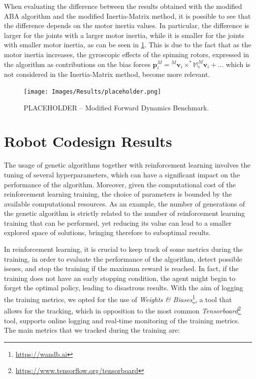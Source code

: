 When evaluating the difference between the results obtained with the modified \ac{ABA} algorithm and the modified Inertia-Matrix method, it is possible to see that the difference depends on the motor inertia values. In particular, the difference is larger for the joints with a larger motor inertia, while it is smaller for the joints with smaller motor inertia, as can be seen in \cref{fig:fd_comparison}. This is due to the fact that as the motor inertia increases, the gyroscopic effects of the spinning rotors,
expressed in the algorithm as contributions on the bias forces $\mathbf{p}^M _i = {}^M \mathbf{v}_i \times ^* \mathbb{M}_i ^M \mathbf{v}_i + \dots$ which is not considered in the Inertia-Matrix method, become more relevant.

\begin{figure}
    \centering
    \caption{PLACEHOLDER -- Modified Forward Dynamics Benchmark.}
    \label{fig:fd_comparison}
    \texttt{[image: Images/Results/placeholder.png]}
\end{figure}

\section{Robot Codesign Results}
\label{sec:codesign_results}

The usage of genetic algorithms together with reinforcement learning involves the tuning of several hyperparameters, which can have a significant impact on the performance of the algorithm. Moreover, given the computational cost of the reinforcement learning training, the choice of parameters is bounded by the available computational resources. As an example, the number of generations of the genetic algorithm is strictly related to the number of reinforcement learning training that can be performed, yet reducing its value can lead to a smaller explored space of solutions, bringing therefore to suboptimal results.

In reinforcement learning, it is crucial to keep track of some metrics during the training, in order to evaluate the performance of the algorithm, detect possible issues, and stop the training if the maximum reward is reached. In fact, if the training does not have an early stopping condition, the agent might begin to forget the optimal policy, leading to disastrous results. With the aim of logging the training metrics, we opted for the use of \textit{Weights {\&} Biases}\footnote{\url{https://wandb.ai}}, a tool that allows for the tracking, which in opposition to the most common \textit{Tensorboard}\footnote{\url{https://www.tensorflow.org/tensorboard}} tool, supports online logging and real-time monitoring of the training metrics. The main metrics that we tracked during the training are:


